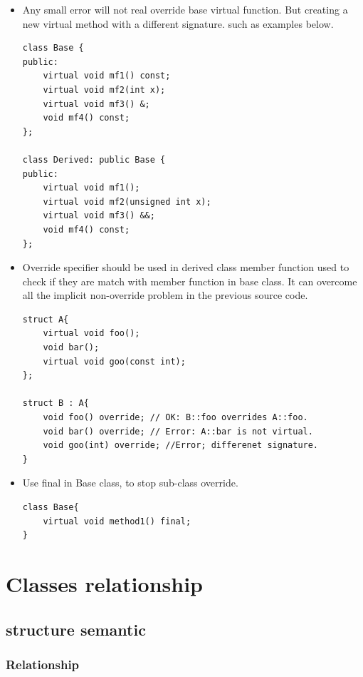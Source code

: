 \documentclass[a4paper,11pt,twoside]{book}
\begin{document}
\begin{itemize}
\begin{lstlisting}
\end{lstlisting}

	
\item Any small error will not real override base virtual function. But creating a new virtual method with a different signature. such as examples below.

\begin{lstlisting}[numbers=none]
class Base {
public:
	virtual void mf1() const;
	virtual void mf2(int x);
	virtual void mf3() &;
	void mf4() const;
};

class Derived: public Base {
public:
	virtual void mf1();
	virtual void mf2(unsigned int x);
	virtual void mf3() &&;
	void mf4() const;
};
\end{lstlisting}
	
	\item Override specifier should be used in derived class member function used to check if they are match with member function in base class. It can overcome all the implicit non-override problem in the previous source code.
\begin{lstlisting}[numbers=none]
struct A{
	virtual void foo();
	void bar();
	virtual void goo(const int);
};
	
struct B : A{
	void foo() override; // OK: B::foo overrides A::foo.
	void bar() override; // Error: A::bar is not virtual.
	void goo(int) override; //Error; differenet signature. 
}
\end{lstlisting}
	
    \item Use final in Base class, to stop sub-class override.
\begin{lstlisting}[numbers=none]
class Base{
	virtual void method1() final;
}
\end{lstlisting}
	
\end{itemize}

\section{Classes relationship}

\subsection{structure semantic}

\subsubsection{Relationship}
\end{document}
